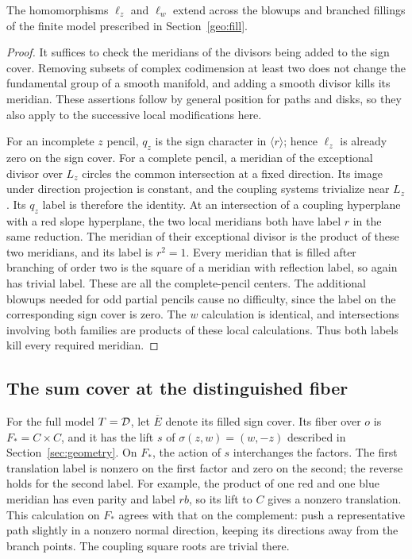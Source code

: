 \begin{lemma}\label{mod:extension}
The homomorphisms $\ell_z$ and $\ell_w$ extend across the blowups and
branched fillings of the finite model prescribed in
Section~\ref{geo:fill}.
\end{lemma}
\begin{proof}
It suffices to check the meridians of the divisors being added to the
sign cover.  Removing subsets of complex codimension at least two
does not change the fundamental group of a smooth manifold, and
adding a smooth divisor kills its meridian.  These assertions follow
by general position for paths and disks, so they also apply to the
successive local modifications here.

For an incomplete $z$ pencil, $q_z$ is the sign character in
$\langle r\rangle$; hence $\ell_z$ is already zero on the sign cover.
For a complete pencil, a meridian of the exceptional divisor over
$L_z$ circles the common intersection at a fixed direction.  Its
image under direction projection is constant, and the coupling
systems trivialize near $L_z$.  Its $q_z$ label is therefore the
identity.  At an intersection of a coupling hyperplane with a red
slope hyperplane, the two local meridians both have label $r$ in the
same reduction.  The meridian of their exceptional divisor is the
product of these two meridians, and its label is $r^2=1$.  Every
meridian that is filled after branching of order two is the square
of a meridian with reflection label, so again has trivial label.
These are all the complete-pencil centers.  The additional blowups
needed for odd partial pencils cause no difficulty, since the label
on the corresponding sign cover is zero.  The $w$ calculation is
identical, and intersections involving both families are products
of these local calculations.  Thus both labels kill every required
meridian.
\end{proof}

\subsection{The sum cover at the distinguished fiber}

For the full model $T=\mathcal D$, let $\overline E$ denote its filled sign
cover.  Its fiber over $o$ is $F_*=C\times C$, and it has the lift
$s$ of $\sigma(z,w)=(w,-z)$ described in Section~\ref{sec:geometry}.
On $F_*$, the action of $s$ interchanges the factors.  The first
translation label is nonzero on the first factor and zero on the
second; the reverse holds for the second label.  For example, the
product of one red and one blue meridian has even parity and label
$rb$, so its lift to $C$ gives a nonzero translation.  This calculation
on $F_*$ agrees with that on the complement: push a representative
path slightly in a nonzero normal direction, keeping its directions
away from the branch points.  The coupling square roots are
trivial there.

